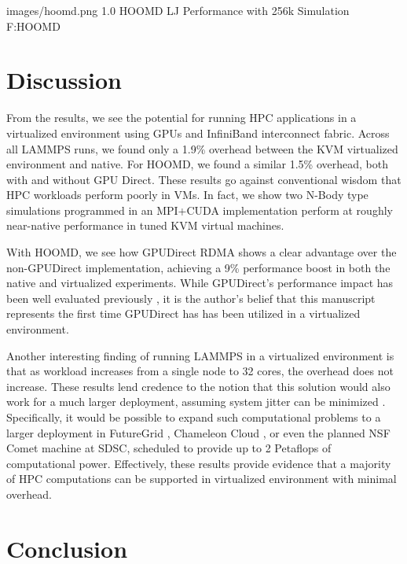 \documentclass[10pt]{sigplanconf}
\begin{document}
  {images/hoomd.png}
  {1.0}
  {HOOMD LJ Performance with 256k Simulation}
  {F:HOOMD}


\section{Discussion}\label{discussion}

From the results, we see the potential for running HPC applications in a virtualized environment using GPUs and InfiniBand interconnect fabric. Across all LAMMPS runs, we found only a 1.9\% overhead between the KVM virtualized environment and native. For HOOMD, we found a similar 1.5\% overhead, both with and without GPU Direct. These results go against conventional wisdom that HPC workloads perform poorly in VMs. In fact, we show two N-Body type simulations programmed in an MPI+CUDA implementation perform at roughly near-native performance in tuned KVM virtual machines.  

With HOOMD, we see how GPUDirect RDMA shows a clear advantage over the
non-GPUDirect implementation, achieving a 9\% performance boost in both the
native and virtualized experiments.  While GPUDirect's performance impact has been well evaluated previously \cite{GPUDirect}, it is the author's belief that this manuscript represents the first time GPUDirect has has been utilized in a virtualized environment.  

Another interesting finding of running LAMMPS in a virtualized environment is that as workload increases from a single node to 32 cores, the overhead does not increase. These results lend credence to the notion that this solution would also work for a much larger deployment, assuming system jitter can be minimized \cite{Seelam2010}. Specifically, it would be possible to expand such computational problems to a larger deployment in FutureGrid \cite{fox2013futuregrid}, Chameleon Cloud \cite{www-chameleon}, or even the planned NSF Comet machine at SDSC, scheduled to provide up to 2 Petaflops of computational power. Effectively, these results provide evidence that a majority of HPC computations can be supported in virtualized environment with minimal overhead. 


\section{Conclusion}\label{conclusion}
\end{document}
